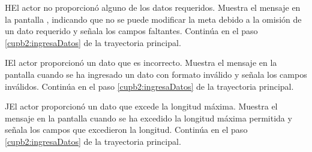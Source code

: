 \begin{UCtrayectoriaA}{H}{El actor no proporcionó alguno de los datos requeridos.}
	\UCpaso[\UCsist] Muestra el mensaje  en la pantalla ,
	indicando que no se puede modificar la meta debido a la omisión de un dato requerido y señala los campos faltantes.
	\UCpaso[] Continúa en el paso \ref{cupb2:ingresaDatos} de la trayectoria principal.
\end{UCtrayectoriaA}

\begin{UCtrayectoriaA}{I}{El actor proporcionó un dato que es incorrecto.}
	\UCpaso[\UCsist] Muestra el mensaje  en la pantalla 
	cuando se ha ingresado un dato con formato inválido y señala los campos inválidos.
	\UCpaso[] Continúa en el paso \ref{cupb2:ingresaDatos} de la trayectoria principal.
\end{UCtrayectoriaA}
 
\begin{UCtrayectoriaA}{J}{El actor proporcionó un dato que excede la longitud máxima.}
	\UCpaso[\UCsist] Muestra el mensaje  en la pantalla 
	cuando se ha excedido la longitud máxima permitida y señala los campos que excedieron la longitud.
	\UCpaso[] Continúa en el paso \ref{cupb2:ingresaDatos} de la trayectoria principal.
\end{UCtrayectoriaA}
